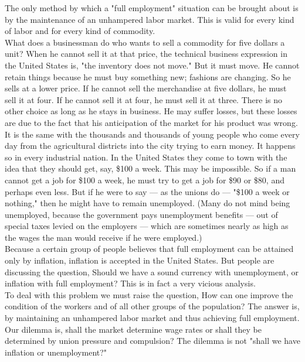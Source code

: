 \documentclass[a4paper]{article}
\begin{document}
The only method by which a "full employment" situation can be brought about is 
by the maintenance of an unhampered labor market. This is valid for every kind 
of labor and for every kind of commodity.\\

What does a businessman do who wants to sell a commodity for five dollars a 
unit? When he cannot sell it at that price, the technical business expression 
in the United States is, "the inventory does not move." But it must move. He 
cannot retain things because he must buy something new; fashions are changing. 
So he sells at a lower price. If he cannot sell the merchandise at five 
dollars, he must sell it at four. If he cannot sell it at four, he must sell it
at three. There is no other choice as long as he stays in business. He may 
suffer losses, but these losses are due to the fact that his anticipation of 
the market for his product was wrong.\\

It is the same with the thousands and thousands of young people who come every 
day from the agricultural districts into the city trying to earn money. It 
happens so in every industrial nation. In the United States they come to town 
with the idea that they should get, say, \$100 a week. This may be impossible. 
So if a man cannot get a job for \$100 a week, he must try to get a job for \$90 
or \$80, and perhaps even less. But if he were to say — as the unions do — "\$100
a week or nothing," then he might have to remain unemployed. (Many do not mind 
being unemployed, because the government pays unemployment benefits — out of 
special taxes levied on the employers — which are sometimes nearly as high as 
the wages the man would receive if he were employed.)\\

Because a certain group of people believes that full employment can be attained
only by inflation, inflation is accepted in the United States. But people are 
discussing the question, Should we have a sound currency with unemployment, or 
inflation with full employment? This is in fact a very vicious analysis.\\

To deal with this problem we must raise the question, How can one improve the 
condition of the workers and of all other groups of the population? The answer 
is, by maintaining an unhampered labor market and thus achieving full 
employment. Our dilemma is, shall the market determine wage rates or shall they
be determined by union pressure and compulsion? The dilemma is not "shall we 
have inflation or unemployment?"\\
\end{document}
